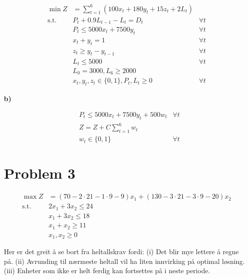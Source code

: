 \documentclass{article}
\begin{document}
\begin{align*}
    \min Z       & = \sum_{t=1}^6 (100x_t + 180y_t + 15z_t + 2L_t)             \\
    \text{s.t. } & P_t + 0.9L_{t-1} - L_t = D_t                    & \forall t \\
                 & P_t \leq 5000x_t + 7500y_t                      & \forall t \\
                 & x_t + y_t = 1                                   & \forall t \\
                 & z_t \geq y_t - y_{t-1}                          & \forall t \\
                 & L_t \leq 5000                                   & \forall t \\
                 & L_0 = 3000, L_6 \geq 2000                                   \\
                 & x_t, y_t, z_t \in \{0,1\}, P_t, L_t \geq 0      & \forall t
\end{align*}

\vspace*{12pt}\small\textbf{b)}

\begin{align*}
     & P_t \leq 5000x_t + 7500y_t + 500w_t & \forall t \\
     & Z = Z + C\sum_{t=1}^6 w_t                       \\
     & w_t \in \{0,1\}                     & \forall t
\end{align*}

\section*{\textbf{Problem 3}}

\begin{align*}
    \max Z       & = (70 - 2 \cdot 21 - 1 \cdot 9 - 9)x_1 + (130 - 3 \cdot 21 - 3 \cdot 9 - 20)x_2 \\
    \text{s.t. } & 2x_1 + 3x_2 \leq 24                                                             \\
                 & x_1 + 3x_2 \leq 18                                                              \\
                 & x_1 + x_2 \geq 11                                                               \\
                 & x_1, x_2 \geq 0
\end{align*}

Her er det greit å se bort fra heltallskrav fordi:
(i) Det blir mye lettere å regne på.
(ii) Avrunding til nærmeste heltall vil ha liten innvirking på optimal løsning.
(iii) Enheter som ikke er helt ferdig kan fortsettes på i neste periode.
\end{document}
